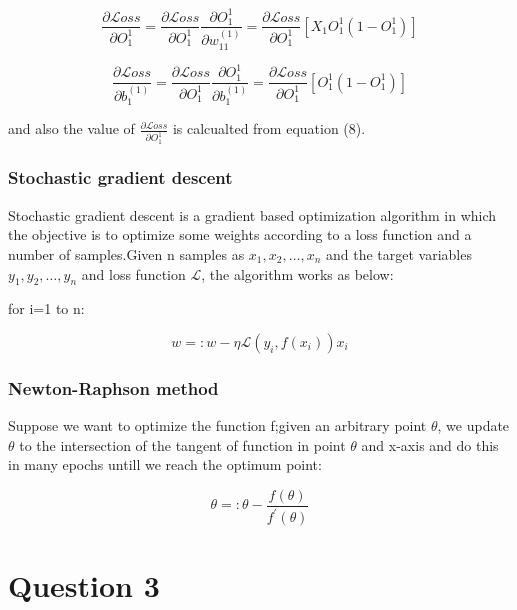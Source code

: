 \documentclass{article}
\newcommand{\loss}{\mathcal{L}oss}
\begin{document}
\begin{equation}
    \frac{\partial{\loss}}{\partial{O_{1}^{1}}} = \frac{\partial{\loss}}{\partial{O_{1}^{1}}}\frac{\partial{O_{1}^{1}}}{\partial{w_{11}^{(1)}}} = \frac{\partial{\loss}}{\partial{O_{1}^{1}}}[
        X_{1}O_{1}^{1}(1 - O_{1}^{1})
    ]
\end{equation}

\begin{equation}
    \frac{\partial{\loss}}{\partial{b_{1}^{(1)}}} = \frac{\partial{\loss}}{\partial{O_{1}^{1}}}\frac{\partial{O_{1}^{1}}}{\partial{b_{1}^{(1)}}} = \frac{\partial{\loss}}{\partial{O_{1}^{1}}}[
        O_{1}^{1}(1 - O_{1}^{1})
    ]
\end{equation}

and also the value of $\frac{\partial{\loss}}{\partial{O_{1}^{1}}}$ is calcualted from equation (8).

\subsubsection*{Stochastic gradient descent}
Stochastic gradient descent is a gradient based optimization algorithm in which the objective is to optimize some weights according to a loss function and 
a number of samples.Given n samples as $x_{1}, x_{2},\dots, x_{n}$ and the target variables $y_{1}, y_{2}, \dots, y_{n}$ and loss function $\mathcal{L}$, the algorithm
works as below:

for i=1 to n:

\begin{equation*}
    w =: w - \eta \mathcal{L}(y_{i}, f(x_{i}))x_{i}
\end{equation*}

\subsubsection*{Newton-Raphson method}
Suppose we want to optimize the function f;given an arbitrary point $\theta$, we update $\theta$ to the intersection of the tangent of function in point $\theta$ and x-axis
and do this in many epochs untill we reach the optimum point:

\begin{equation*}
    \theta =: \theta - \frac{f(\theta)}{f^{\prime}(\theta)}
\end{equation*}


\section*{Question 3}
\end{document}

